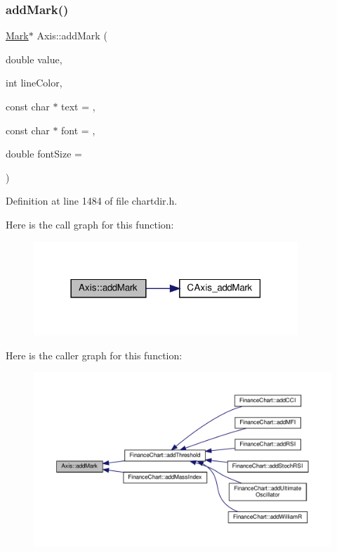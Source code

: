 \subsubsection{\texorpdfstring{add\+Mark()}{addMark()}}
{\footnotesize\ttfamily \hyperlink{class_mark}{Mark}$\ast$ Axis\+::add\+Mark (\begin{DoxyParamCaption}\item[{double}]{value,  }\item[{int}]{line\+Color,  }\item[{const char $\ast$}]{text = {},  }\item[{const char $\ast$}]{font = {},  }\item[{double}]{font\+Size = {} }\end{DoxyParamCaption})\hspace{0.3cm}{\ttfamily [inline]}}



Definition at line 1484 of file chartdir.\+h.

Here is the call graph for this function\+:
\nopagebreak
\begin{figure}[H]
\begin{center}
\leavevmode
\includegraphics[width=282pt]{class_axis_afd32537a0ccccbef0efea8c28a285530_cgraph}
\end{center}
\end{figure}
Here is the caller graph for this function\+:
\nopagebreak
\begin{figure}[H]
\begin{center}
\leavevmode
\includegraphics[width=350pt]{class_axis_afd32537a0ccccbef0efea8c28a285530_icgraph}
\end{center}
\end{figure}
\mbox{\label{class_axis_a999b49b9678d07a36a4175fd0a81fabd}} 
